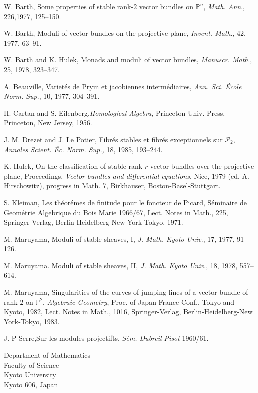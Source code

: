 \begin{thebibliography}{99}
\itemsep=2pt
{W. Barth}, Some properties of stable rank-$2$ vector bundles
on $\mathbb{P}^{n}$, \textit{Math. Ann}., 226,1977, 125--150.


{W. Barth}, Moduli of vector bundles on the projective plane,
\textit{Invent. Math}., 42, 1977, 63--91.

{W. Barth and K. Hulek}, Monads and moduli of vector bundles,
\textit{Manuscr. Math}., 25, 1978, 323--347.

{A. Beauville}, Variet\'{e}s de Prym et jacobiennes
interm\'{e}diaires, \textit{Ann. Sci. \'{E}cole Norm. Sup}., 10, 1977,
304--391.

{H. Cartan and  S. Eilenberg},\pageoriginale \textit{Homological Algebra},
Princeton Univ. Press, Princeton, New Jersey, 1956.

{J. M. Drezet and  J. Le Potier}, Fibr\'{e}s stables et
fibr\'{e}s exceptionnels sur $\mathscr{P}_2$, \textit{Annales
Scient. \'{E}c. Norm. Sup.,} 18, 1985, 193--244.

{K. Hulek}, On the classification of stable rank-$r$ vector
bundles over the projective plane, Proceedings, \textit{Vector bundles
and differential equations}, Nice, 1979 (ed. A. Hirschowitz), progress
in Math. 7, Birkhauser, Boston-Basel-Stuttgart.

{S. Kleiman}, Les th\'{e}or\'{e}mes de finitude pour le foncteur
de Picard, S\'{e}minaire de Geom\'{e}trie Algebrique du Bois Marie
1966/67, Lect. Notes in Math., 225, Springer-Verlag,
Berlin-Heidelberg-New York-Tokyo, 1971.

{M. Maruyama}, Moduli of stable sheaves, I, \textit{J. Math. Kyoto
  Univ}., 17, 1977, 91--126.

{M. Maruyama}. Moduli of stable sheaves, II,
\textit{J. Math. Kyoto Univ}., 18, 1978, 557--614.

{M. Maruyama}, Singularities of the curves of jumping lines of a
vector bundle of rank $2$ on $\mathbb{P}^{2}$, \textit{Algebraic
  Geometry}, Proc. of Japan-France Conf., Tokyo and Kyoto, 1982,
Lect. Notes in Math., 1016, Springer-Verlag, Berlin-Heidelberg-New
York-Tokyo, 1983.

{J.-P Serre},\pageoriginale Sur les modules projectifts,
\textit{S\'{e}m. Dubreil Pisot} 1960/61.
\end{thebibliography}

\bigskip

\noindent
Department of Mathematics\\
Faculty of Science\\
Kyoto University\\
Kyoto 606, Japan


\newpage

~\phantom{a}
\thispagestyle{empty}





